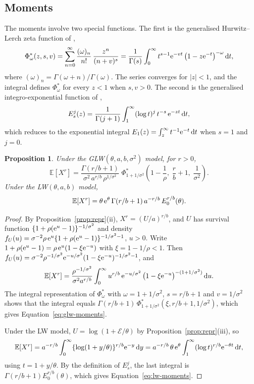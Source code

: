 \documentclass[12pt]{article}
\newcommand{\E}{\mathbb{E}}       %
\newcommand{\e}{{\rm e}}         %
\newcommand{\dd}{{\rm d}}        %
\newcommand{\Exp}{\mathcal{E}}   %
\newtheorem{proposition}{Proposition}
\begin{document}
\subsection{Moments}

The moments involve two special functions. The first is the generalised Hurwitz--Lerch zeta function of \citet{goyal1997generalized},
\[
\Phi^\ast_\omega(z,s,v)=\sum_{n=0}^{\infty}\frac{(\omega)_n}{n!}\,\frac{z^n}{(n+v)^s}
=\frac{1}{\Gamma(s)}\int_0^\infty t^{s-1}\e^{-vt}\left(1-z\e^{-t}\right)^{-\omega}\dd t,
\]
where $(\omega)_n=\Gamma(\omega+n)/\Gamma(\omega)$. The series converges for $|z|<1$, and the integral defines $\Phi^\ast_\omega$ for every $z<1$ when $s,v>0$. The second is the generalised integro-exponential function of \citet{milgram1985generalized},
\[
E_s^j(z)=\frac{1}{\Gamma(j+1)}\int_1^\infty(\log t)^j\,t^{-s}\,\e^{-zt}\,\dd t,
\]
which reduces to the exponential integral $E_1(z)=\int_z^\infty t^{-1}\e^{-t}\,\dd t$ when $s=1$ and $j=0$.

\begin{proposition}\label{prop:moments-glw}
Under the GLW$(\theta,a,b,\sigma^2)$ model, for $r>0$,
\begin{equation}\label{eq:glw-moments}
\E[X^r]=\frac{\Gamma(r/b+1)}{\sigma^2\,a^{r/b}\,\rho^{1/\sigma^2}}\;\Phi^\ast_{1+1/\sigma^2}\!\left(1-\frac1\rho,\;\frac rb+1,\;\frac1{\sigma^2}\right).
\end{equation}
Under the LW$(\theta,a,b)$ model,
\begin{equation}\label{eq:lw-moments}
\E[X^r]=\theta\,\e^{\theta}\,\Gamma(r/b+1)\,a^{-r/b}\,E_0^{r/b}(\theta).
\end{equation}
\end{proposition}

\begin{proof}
By Proposition~\ref{prop:repr}(ii), $X^r=(U/a)^{r/b}$, and $U$ has survival function $\{1+\rho(\e^u-1)\}^{-1/\sigma^2}$ and density $f_U(u)=\sigma^{-2}\rho\,\e^{u}\{1+\rho(\e^u-1)\}^{-1/\sigma^2-1}$, $u>0$. Write $1+\rho(\e^u-1)=\rho\,\e^u(1-\xi\e^{-u})$ with $\xi=1-1/\rho<1$. Then $f_U(u)=\sigma^{-2}\rho^{-1/\sigma^2}\e^{-u/\sigma^2}(1-\xi\e^{-u})^{-1/\sigma^2-1}$, and
\[
\E[X^r]=\frac{\rho^{-1/\sigma^2}}{\sigma^2 a^{r/b}}\int_0^\infty u^{r/b}\,\e^{-u/\sigma^2}\left(1-\xi\e^{-u}\right)^{-(1+1/\sigma^2)}\dd u.
\]
The integral representation of $\Phi^\ast_\omega$ with $\omega=1+1/\sigma^2$, $s=r/b+1$ and $v=1/\sigma^2$ shows that the integral equals $\Gamma(r/b+1)\,\Phi^\ast_{1+1/\sigma^2}(\xi,r/b+1,1/\sigma^2)$, which gives Equation~\eqref{eq:glw-moments}.

Under the LW model, $U=\log(1+\Exp/\theta)$ by Proposition~\ref{prop:repr}(iii), so
\[
\E[X^r]=a^{-r/b}\int_0^\infty\{\log(1+y/\theta)\}^{r/b}\e^{-y}\,\dd y=a^{-r/b}\,\theta\,\e^{\theta}\int_1^\infty(\log t)^{r/b}\e^{-\theta t}\,\dd t,
\]
using $t=1+y/\theta$. By the definition of $E_s^j$, the last integral is $\Gamma(r/b+1)E_0^{r/b}(\theta)$, which gives Equation~\eqref{eq:lw-moments}.
\end{proof}
\end{document}
